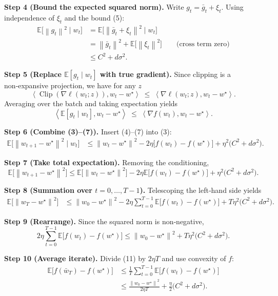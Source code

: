 \documentclass{article}
\newcommand{\E}{\mathbb{E}}
\newcommand{\norm}[1]{\left\|#1\right\|}
\newcommand{\ip}[2]{\left\langle #1,#2\right\rangle}
\newcommand{\grad}{\nabla}
\newcommand{\clip}[1]{\operatorname{Clip}\!\left(#1\right)}
\begin{document}
\noindent\textbf{Step 4 (Bound the expected squared norm).}  
Write $g_t=\bar g_t+\xi_t$. Using independence of $\xi_t$ and the bound (5):
\[
\begin{aligned}
\E\!\bigl[\norm{g_t}^{2}\mid w_t\bigr]
 &= \E\!\bigl[\norm{\bar g_t+\xi_t}^{2}\mid w_t\bigr]  \\
 &= \norm{\bar g_t}^{2}+ \E\!\bigl[\norm{\xi_t}^{2}\bigr]    \qquad\text{(cross term zero)}\\
 &\le C^{2}+ d\sigma^{2}.
\end{aligned}
\tag{6}
\]

\noindent\textbf{Step 5 (Replace $\E[g_t\mid w_t]$ with true gradient).}  
Since clipping is a non‑expansive projection, we have for any $z$
\[
\ip{\clip{\grad\ell(w_t;z)}}{w_t-w^{\star}}
 \;\le\; \ip{\grad\ell(w_t;z)}{w_t-w^{\star}} .
\]
Averaging over the batch and taking expectation yields
\[
\ip{\E[g_t\mid w_t]}{w_t-w^{\star}}
 \;\le\; \ip{\grad f(w_t)}{w_t-w^{\star}} .
\tag{7}
\]

\noindent\textbf{Step 6 (Combine (3)–(7)).}  
Insert (4)–(7) into (3):
\[
\begin{aligned}
\E\!\bigl[\norm{w_{t+1}-w^{\star}}^{2}\mid w_t\bigr]
 &\le \norm{w_t-w^{\star}}^{2}
      -2\eta\bigl[f(w_t)-f(w^{\star})\bigr]
      +\eta^{2}\bigl(C^{2}+d\sigma^{2}\bigr).
\end{aligned}
\tag{8}
\]

\noindent\textbf{Step 7 (Take total expectation).}  
Removing the conditioning,
\[
\E\!\bigl[\norm{w_{t+1}-w^{\star}}^{2}\bigr]
 \le \E\!\bigl[\norm{w_t-w^{\star}}^{2}\bigr]
      -2\eta\E\!\bigl[f(w_t)-f(w^{\star})\bigr]
      +\eta^{2}\bigl(C^{2}+d\sigma^{2}\bigr).
\tag{9}
\]

\noindent\textbf{Step 8 (Summation over $t=0,\dots,T-1$).}  
Telescoping the left‑hand side yields
\[
\begin{aligned}
\E\!\bigl[\norm{w_T-w^{\star}}^{2}\bigr]
 &\le \norm{w_0-w^{\star}}^{2}
      -2\eta\sum_{t=0}^{T-1}\E\!\bigl[f(w_t)-f(w^{\star})\bigr]
      +T\eta^{2}\bigl(C^{2}+d\sigma^{2}\bigr).
\end{aligned}
\tag{10}
\]

\noindent\textbf{Step 9 (Rearrange).}  
Since the squared norm is non‑negative,
\[
2\eta\sum_{t=0}^{T-1}\E\!\bigl[f(w_t)-f(w^{\star})\bigr]
 \le \norm{w_0-w^{\star}}^{2}+T\eta^{2}\bigl(C^{2}+d\sigma^{2}\bigr).
\tag{11}
\]

\noindent\textbf{Step 10 (Average iterate).}  
Divide (11) by $2\eta T$ and use convexity of $f$:
\[
\begin{aligned}
\E\!\bigl[f(\bar w_T)-f(w^{\star})\bigr]
 &\le \frac{1}{T}\sum_{t=0}^{T-1}\E\!\bigl[f(w_t)-f(w^{\star})\bigr] \\
 &\le \frac{\norm{w_0-w^{\star}}^{2}}{2\eta T}
      +\frac{\eta}{2}\bigl(C^{2}+d\sigma^{2}\bigr).
\end{aligned}
\tag{12}
\]
\end{document}
